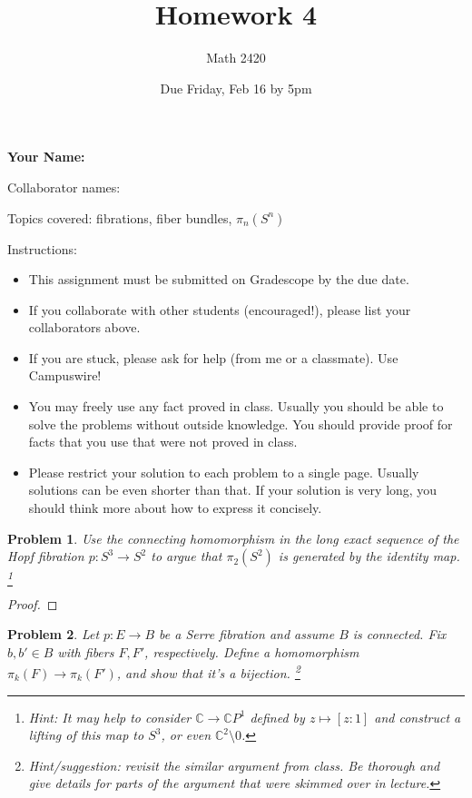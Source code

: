 \documentclass[11pt]{article}
\author{Math 2420}
\date{Due Friday, Feb 16 by 5pm}
\title{Homework 4}
\newtheorem{problem}{Problem}
\begin{document}
\maketitle

{\bf\Large Your Name:} 

Collaborator names: 


\vspace{.3in}
Topics covered: fibrations, fiber bundles, $\pi_n(S^n)$

Instructions: 
\begin{itemize}
\item This assignment must be submitted on Gradescope by the due date. 
\item If you collaborate with other students (encouraged!), please list your collaborators above. 
\item If you are stuck, please ask for help (from me or a classmate). Use Campuswire!  
\item You may freely use any fact proved in class. Usually you should be able to solve the problems without outside knowledge. You should provide proof for facts that you use that were not proved in class. 
\item Please restrict your solution to each problem to a single page. Usually solutions can be even shorter than that. If your solution is very long, you should think more about how to express it concisely.
\end{itemize}
\pagebreak 


\pagebreak 


\begin{problem}
Use the connecting homomorphism in the long exact sequence of the Hopf fibration $p:S^3\to S^2$ to argue that $\pi_2(S^2)$ is generated by the identity map. \footnote{Hint: It may help to consider $\mathbb C\to\mathbb C P^1$ defined by $z\mapsto[z:1]$ and construct a lifting of this map to $S^3$, or even $\mathbb C^2\setminus0$.}
\end{problem}

\begin{proof}

\end{proof}

\pagebreak 

\begin{problem}
Let $p:E\to B$ be a Serre fibration and assume $B$ is connected. Fix $b,b'\in B$ with fibers $F,F'$, respectively. Define a homomorphism $\pi_k(F)\to\pi_k(F')$, and show that it's a bijection. \footnote{Hint/suggestion: revisit the similar argument from class. Be thorough and give details for parts of the argument that were skimmed over in lecture.} 
\end{problem}
\end{document}
